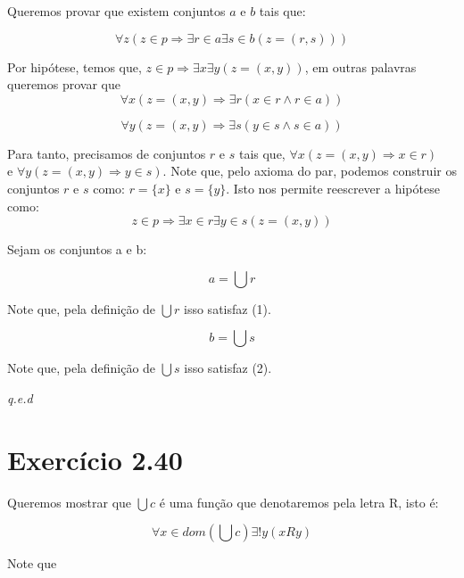 \documentclass[12pt]{extarticle}
\newcommand{\fim}{\begin{flushright}

   \emph{q.e.d}
\end{flushright}}
\begin{document}
Queremos provar que existem conjuntos $a$ e $b$ tais que:

$$
\forall z ( z \in p \Rightarrow \exists r \in a \exists s \in b (z = (r,s)))
$$

Por hipótese, temos que, $z \in p \Rightarrow \exists x \exists y (z = (x,y))$, em outras palavras queremos provar que 
\begin{equation}
\forall x (z = (x,y) \Rightarrow \exists r (x \in r \land r \in a))    
\end{equation}



\begin{equation}
\forall y (z = (x,y) \Rightarrow \exists s (y \in s \land s \in a))   
\end{equation}







Para tanto, precisamos de conjuntos $r$ e $s$ tais que, $\forall x ( z = (x,y) \Rightarrow x \in r)$ \\ e $\forall y ( z = (x,y) \Rightarrow y \in s)$. Note que, pelo axioma do par, podemos construir os conjuntos $r$ e $s$ como: $r = \{x\}$ e $s = \{y\}$. Isto nos permite reescrever a hipótese como:
$$
z \in p \Rightarrow \exists x \in r \exists y \in s (z = (x,y))
$$

Sejam os conjuntos a e b:

$$
a = \bigcup r
$$

Note que, pela definição de $\bigcup r$ isso satisfaz (1).

$$
b = \bigcup s
$$

Note que, pela definição de $\bigcup s$ isso satisfaz (2).

\fim

\section{Exercício 2.40}

Queremos mostrar que $\bigcup c$ é uma função que denotaremos pela letra R, isto é:

$$\forall x \in dom (\bigcup c) \exists! y (xRy) $$

Note que
\end{document}
